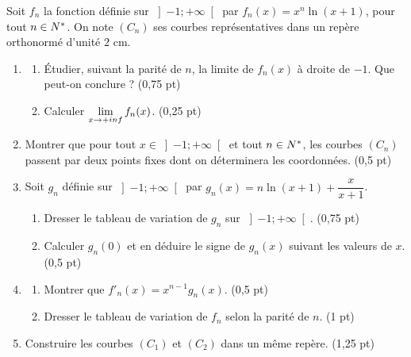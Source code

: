 \begin{commeaubac}
Soit $f_{n}$ la fonction définie sur $\left]-1;+\infty\right[$ par
$f_{n}(x) = x^{n}\ln(x+1)$, pour tout $n \in N^{*}$. On note $(C_{n})$ ses
courbes représentatives dans un repère orthonormé d'unité $2$ cm.

\begin{enumerate}[label=\textbf{\arabic*.}, leftmargin=*, itemsep=0.25em]
  \item \begin{enumerate}[label=\textbf{\alph*)}, leftmargin=1.4em]
          \item Étudier, suivant la parité de $n$, la limite de $f_{n}(x)$ à
                droite de $-1$. Que peut-on conclure ?
                \hfill\textup{(0,75 pt)}
          \item Calculer $\limpinf f_{n}(x)$. \hfill\textup{(0,25 pt)}
        \end{enumerate}
  \item Montrer que pour tout $x \in \left]-1;+\infty\right[$ et tout
        $n \in N^{*}$, les courbes $(C_{n})$ passent par deux points fixes
        dont on déterminera les coordonnées. \hfill\textup{(0,5 pt)}
  \item Soit $g_{n}$ définie sur $\left]-1;+\infty\right[$ par
        $g_{n}(x) = n\ln(x+1) + \dfrac{x}{x+1}$.
        \begin{enumerate}[label=\textbf{\alph*)}, leftmargin=1.4em]
          \item Dresser le tableau de variation de $g_{n}$ sur
                $\left]-1;+\infty\right[$. \hfill\textup{(0,75 pt)}
          \item Calculer $g_{n}(0)$ et en déduire le signe de $g_{n}(x)$
                suivant les valeurs de $x$. \hfill\textup{(0,5 pt)}
        \end{enumerate}
  \item \begin{enumerate}[label=\textbf{\alph*)}, leftmargin=1.4em]
          \item Montrer que $f'_{n}(x) = x^{n-1}g_{n}(x)$.
                \hfill\textup{(0,5 pt)}
          \item Dresser le tableau de variation de $f_{n}$ selon la parité
                de $n$. \hfill\textup{(1 pt)}
        \end{enumerate}
  \item Construire les courbes $(C_{1})$ et $(C_{2})$ dans un même repère.
        \hfill\textup{(1,25 pt)}
\end{enumerate}
\end{commeaubac}

